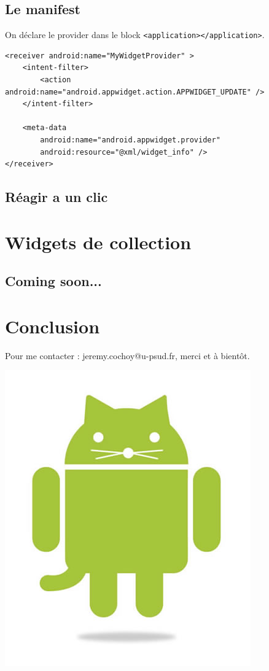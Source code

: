 \documentclass{beamer}
\begin{document}
\subsection{Le manifest}
\begin{frame}[fragile]
\begin{block}{On déclare le provider dans le block \verb!<application></application>!.}
\lstset{language=xml}
\begin{lstlisting}
<receiver android:name="MyWidgetProvider" >
    <intent-filter>
        <action android:name="android.appwidget.action.APPWIDGET_UPDATE" />
    </intent-filter>

    <meta-data
        android:name="android.appwidget.provider"
        android:resource="@xml/widget_info" />
</receiver>
\end{lstlisting}
\end{block}
\end{frame}

\subsection{Réagir a un clic}


\section{Widgets de collection}
\subsection{Coming soon...}

\section{Conclusion}

\begin{frame}
\begin{center}
Pour me contacter : jeremy.cochoy@u-psud.fr, merci et à bientôt.

\medskip
\medskip
\medskip
\medskip

\includegraphics[scale=0.3]{android_cat.jpg}
\end{center}
\end{frame}
\end{document}
